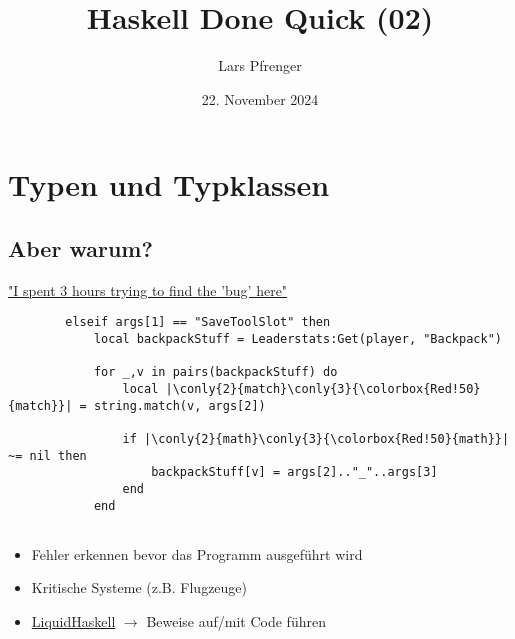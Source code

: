 \documentclass[
	aspectratio=169, 
	10pt 
]{beamer}
\title{Haskell Done Quick (02)}
\author{Lars Pfrenger}
\date{22. November 2024}
\newcommand\conly[2]{\only<#1>{#2}}
\begin{document}
\maketitle

\section{Typen und Typklassen}

\subsection{Aber warum?}
\begin{frame}[t,fragile]{\insertsubsection}
	\large\href{https://www.reddit.com/r/programminghorror/comments/1gvkile/i_spent_3_hours_trying_to_find_the_bug_here/}{\faReddit \space "I spent 3 hours trying to find the 'bug' here"}\normalsize
	\bigskip
	\pause
	\begin{verbatim}
		elseif args[1] == "SaveToolSlot" then
			local backpackStuff = Leaderstats:Get(player, "Backpack")
		
			for _,v in pairs(backpackStuff) do
				local |\conly{2}{match}\conly{3}{\colorbox{Red!50}{match}}| = string.match(v, args[2])
			
				if |\conly{2}{math}\conly{3}{\colorbox{Red!50}{math}}| ~= nil then
					backpackStuff[v] = args[2].."_"..args[3]
				end
			end
	
	\end{verbatim}
\end{frame}


\begin{frame}{\insertsubsection}
	\begin{itemize}
		\item Fehler erkennen bevor das Programm ausgeführt wird 
		\item Kritische Systeme (z.B. Flugzeuge)
		\item \href{https://ucsd-progsys.github.io/liquidhaskell/}{LiquidHaskell} $\rightarrow$ Beweise auf/mit Code führen
	\end{itemize}
\end{frame}

\end{document}
